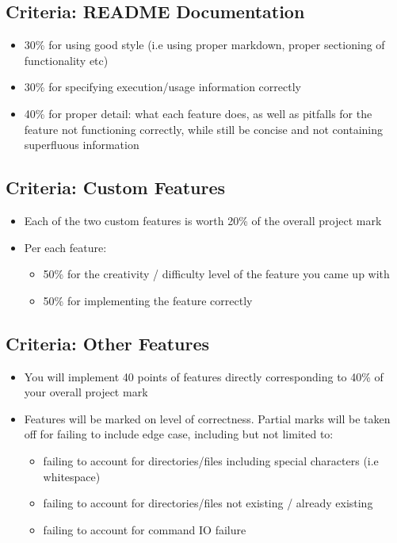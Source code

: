 \documentclass{article}
\begin{document}
\subsection{Criteria: README Documentation}
\label{sec:org65f627a}
\begin{itemize}
\item {\color{purple}30\%} for using good style (i.e using proper markdown, proper
sectioning of functionality etc)
\item {\color{purple}30\%} for specifying execution/usage information correctly
\item {\color{purple}40\%} for proper detail: what each feature does, as well as
pitfalls for the feature not functioning correctly, while still be concise
and not containing superfluous information
\end{itemize}

\subsection{Criteria: Custom Features}
\label{sec:org212330d}
\begin{itemize}
\item Each of the two custom features is worth {\color{purple}20\%} of the overall project mark
\item Per each feature:
\begin{itemize}
\item {\color{purple}50\%} for the creativity / difficulty level of
the feature you came up with
\item {\color{purple}50\%} for implementing the feature correctly
\end{itemize}
\end{itemize}

\subsection{Criteria: Other Features}
\label{sec:org7bca8d6}
\begin{itemize}
\item You will implement {\color{purple}40 points} of features directly corresponding
to {\color{purple}40\%} of your overall project mark
\item Features will be marked on level of correctness. Partial marks will be
taken off for failing to include edge case, including but not limited to:
\begin{itemize}
\item failing to account for directories/files including special characters
(i.e whitespace)
\item failing to account for directories/files not existing / already existing
\item failing to account for command IO failure
\end{itemize}
\end{itemize}
\end{document}
